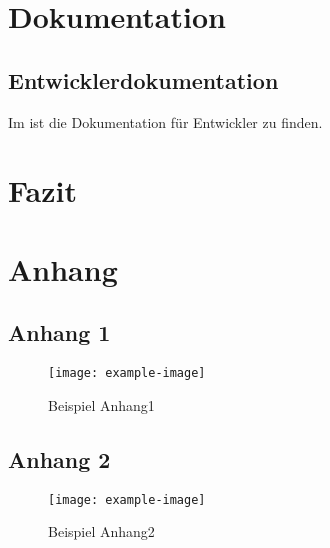 \documentclass[12pt, a4paper]{article}
\begin{document}
\section{Dokumentation}
    \subsection{Entwicklerdokumentation}
    Im  ist die Dokumentation für Entwickler zu finden.

\section{Fazit}

\clearpage
\appendix
\section{Anhang}

    \subsection{Anhang 1}\label{anhang:Anhang1}
    \begin{figure}[htb]
        \centering
        \texttt{[image: example-image]}
        \caption{Beispiel Anhang1}
    \end{figure}

    \clearpage
    \subsection{Anhang 2}\label{anhang:Anhang2}
    \begin{figure}[htb]
        \centering
        \texttt{[image: example-image]}
        \caption{Beispiel Anhang2}
    \end{figure}
    
\end{document}
